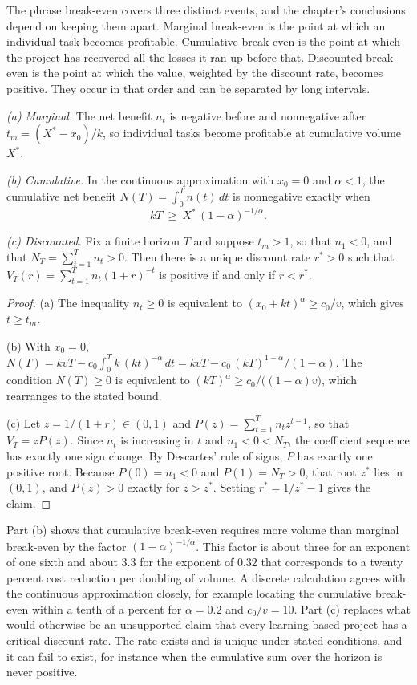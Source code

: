 The phrase break-even covers three distinct events, and the chapter's conclusions depend on keeping them apart. Marginal break-even is the point at which an individual task becomes profitable. Cumulative break-even is the point at which the project has recovered all the losses it ran up before that. Discounted break-even is the point at which the value, weighted by the discount rate, becomes positive. They occur in that order and can be separated by long intervals.

\begin{proposition}
\label{prop:breakeven}
\emph{(a) Marginal.} The net benefit $n_t$ is negative before and nonnegative after $t_m=(X^{*}-x_0)/k$, so individual tasks become profitable at cumulative volume $X^{*}$.

\emph{(b) Cumulative.} In the continuous approximation with $x_0=0$ and $\alpha<1$, the cumulative net benefit $N(T)=\int_0^{T}n(t)\,dt$ is nonnegative exactly when
\[
kT\ \ge\ X^{*}\,(1-\alpha)^{-1/\alpha}.
\]

\emph{(c) Discounted.} Fix a finite horizon $T$ and suppose $t_m>1$, so that $n_1<0$, and that $N_T=\sum_{t=1}^{T}n_t>0$. Then there is a unique discount rate $r^{*}>0$ such that $V_T(r)=\sum_{t=1}^{T}n_t(1+r)^{-t}$ is positive if and only if $r<r^{*}$.
\end{proposition}

\begin{proof}
(a) The inequality $n_t\ge0$ is equivalent to $(x_0+kt)^{\alpha}\ge c_0/v$, which gives $t\ge t_m$.

(b) With $x_0=0$, $N(T)=kvT-c_0\int_0^{T}k\,(kt)^{-\alpha}\,dt=kvT-c_0\,(kT)^{1-\alpha}/(1-\alpha)$. The condition $N(T)\ge0$ is equivalent to $(kT)^{\alpha}\ge c_0/\bigl((1-\alpha)v\bigr)$, which rearranges to the stated bound.

(c) Let $z=1/(1+r)\in(0,1)$ and $P(z)=\sum_{t=1}^{T}n_tz^{t-1}$, so that $V_T=zP(z)$. Since $n_t$ is increasing in $t$ and $n_1<0<N_T$, the coefficient sequence has exactly one sign change. By Descartes' rule of signs, $P$ has exactly one positive root. Because $P(0)=n_1<0$ and $P(1)=N_T>0$, that root $z^{*}$ lies in $(0,1)$, and $P(z)>0$ exactly for $z>z^{*}$. Setting $r^{*}=1/z^{*}-1$ gives the claim.
\end{proof}

Part (b) shows that cumulative break-even requires more volume than marginal break-even by the factor $(1-\alpha)^{-1/\alpha}$. This factor is about three for an exponent of one sixth and about 3.3 for the exponent of $0.32$ that corresponds to a twenty percent cost reduction per doubling of volume. A discrete calculation agrees with the continuous approximation closely, for example locating the cumulative break-even within a tenth of a percent for $\alpha=0.2$ and $c_0/v=10$. Part (c) replaces what would otherwise be an unsupported claim that every learning-based project has a critical discount rate. The rate exists and is unique under stated conditions, and it can fail to exist, for instance when the cumulative sum over the horizon is never positive.

